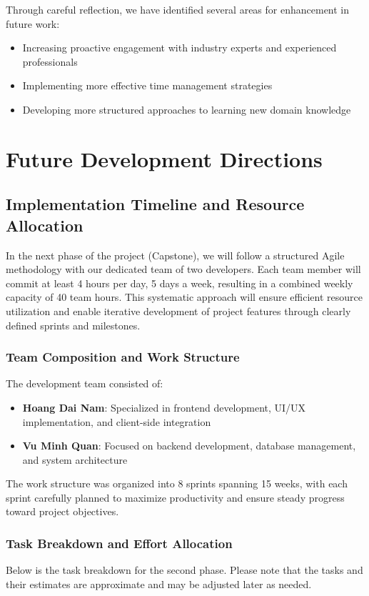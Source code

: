 Through careful reflection, we have identified several areas for enhancement in future work:

\begin{itemize}
    \item Increasing proactive engagement with industry experts and experienced professionals
    \item Implementing more effective time management strategies
    \item Developing more structured approaches to learning new domain knowledge
\end{itemize}

\section{Future Development Directions}
\subsection{Implementation Timeline and Resource Allocation}
In the next phase of the project (Capstone), we will follow a structured Agile methodology with our dedicated team of two developers. Each team member will commit at least 4 hours per day, 5 days a week, resulting in a combined weekly capacity of 40 team hours. This systematic approach will ensure efficient resource utilization and enable iterative development of project features through clearly defined sprints and milestones.

\subsubsection{Team Composition and Work Structure}
The development team consisted of:
\begin{itemize}
    \item \textbf{Hoang Dai Nam}: Specialized in frontend development, UI/UX implementation, and client-side integration
    \item \textbf{Vu Minh Quan}: Focused on backend development, database management, and system architecture
\end{itemize}

The work structure was organized into 8 sprints spanning 15 weeks, with each sprint carefully planned to maximize productivity and ensure steady progress toward project objectives.

\subsubsection{Task Breakdown and Effort Allocation}
Below is the task breakdown for the second phase. Please note that the tasks and their estimates are approximate and may be adjusted later as needed.
